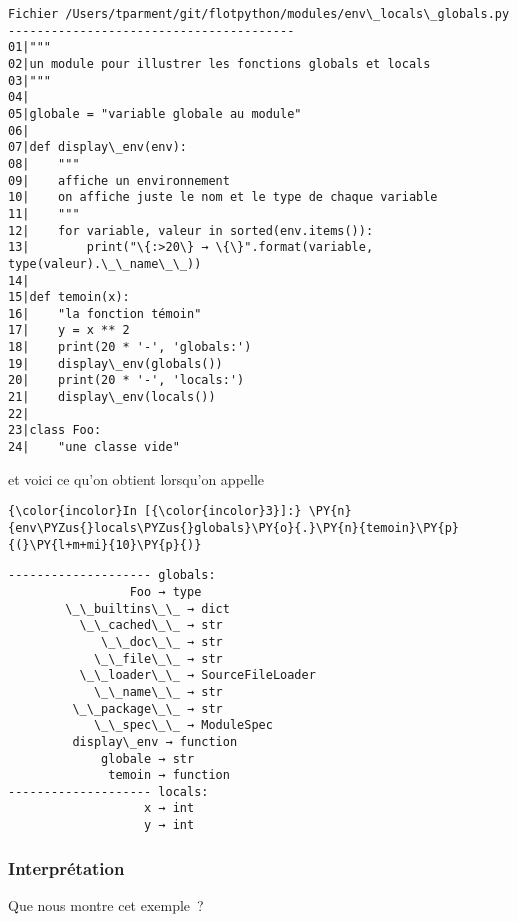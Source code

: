    \begin{Verbatim}[commandchars=\\\{\}]
Fichier /Users/tparment/git/flotpython/modules/env\_locals\_globals.py
----------------------------------------
01|"""
02|un module pour illustrer les fonctions globals et locals
03|"""
04|
05|globale = "variable globale au module"
06|
07|def display\_env(env):
08|    """
09|    affiche un environnement
10|    on affiche juste le nom et le type de chaque variable
11|    """
12|    for variable, valeur in sorted(env.items()):
13|        print("\{:>20\} → \{\}".format(variable, type(valeur).\_\_name\_\_))
14|
15|def temoin(x):
16|    "la fonction témoin"
17|    y = x ** 2
18|    print(20 * '-', 'globals:')
19|    display\_env(globals())
20|    print(20 * '-', 'locals:')
21|    display\_env(locals())
22|
23|class Foo:
24|    "une classe vide"

    \end{Verbatim}

    et voici ce qu'on obtient lorsqu'on appelle

    \begin{Verbatim}[commandchars=\\\{\}]
{\color{incolor}In [{\color{incolor}3}]:} \PY{n}{env\PYZus{}locals\PYZus{}globals}\PY{o}{.}\PY{n}{temoin}\PY{p}{(}\PY{l+m+mi}{10}\PY{p}{)}
\end{Verbatim}


    \begin{Verbatim}[commandchars=\\\{\}]
-------------------- globals:
                 Foo → type
        \_\_builtins\_\_ → dict
          \_\_cached\_\_ → str
             \_\_doc\_\_ → str
            \_\_file\_\_ → str
          \_\_loader\_\_ → SourceFileLoader
            \_\_name\_\_ → str
         \_\_package\_\_ → str
            \_\_spec\_\_ → ModuleSpec
         display\_env → function
             globale → str
              temoin → function
-------------------- locals:
                   x → int
                   y → int

    \end{Verbatim}

    \hypertarget{interpruxe9tation}{%
\subsubsection{Interprétation}\label{interpruxe9tation}}

    Que nous montre cet exemple~?

